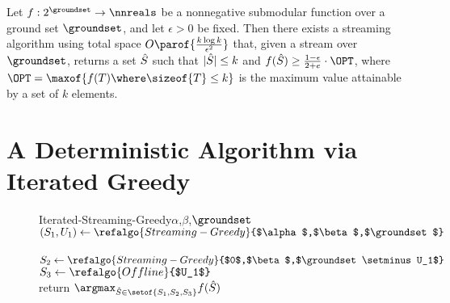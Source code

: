 \documentclass[oneside,letterpaper]{scrartcl} \usepackage{macros}
\newcommand{\eps}{\epsilon}
\begin{document}
\begin{theorem}
  Let $f: 2^{\groundset} \to \nnreals$ be a nonnegative submodular
  function over a ground set $\groundset$, and let $\eps > 0$ be
  fixed. Then there exists a streaming algorithm using total space
  \begin{math}
    O\parof{\frac{k \log k}{\epsilon^2}}
  \end{math} that, given a stream over $\groundset$, returns a set $\hat{S}$
  such that $|\hat{S}| \leq k$ and
  \begin{math}
    f(\bestset) \geq \frac{1-\epsilon}{2 + e} \cdot \OPT \end{math}, where $\OPT = \maxof{f(T) \where \sizeof{T} \leq k}$ is the maximum value attainable by a set of $k$ elements.
\end{theorem}





\FloatBarrier
\section{A Deterministic Algorithm via Iterated Greedy}
\begin{figure}[t]
  \centering
  \begin{minipage}{7.5cm}
\begin{framed}
      \begin{pseudocode}
        \begin{routine}{Iterated-Streaming-Greedy}{$\alpha$,$\beta$,$\groundset$}
          \\
          $(S_1,U_1) \gets
          \refalgo{Streaming-Greedy}{$\alpha$,$\beta$,$\groundset$}$
          \\
          \\
          $S_2 \gets
          \refalgo{Streaming-Greedy}{$0$,$\beta$,$\groundset
            \setminus U_1$}$\\
          $S_3 \gets \refalgo{Offline}{$U_1$}$\\
          return $\argmax_{\bestset \in \setof{S_1,S_2,S_3}}
          f(\bestset)$
        \end{routine}
      \end{pseudocode}
    \end{framed}
\end{minipage}
\end{figure}
\end{document}
